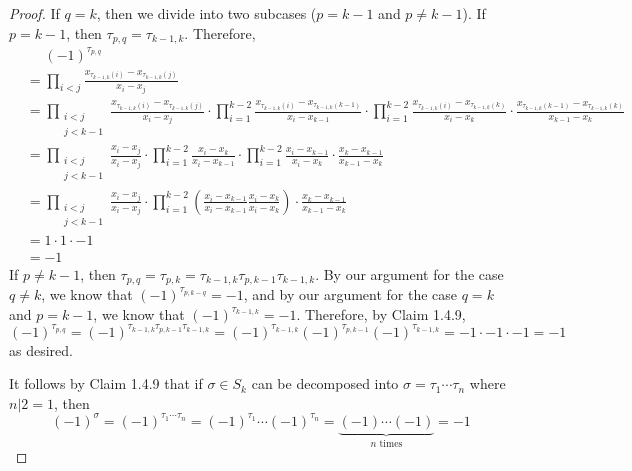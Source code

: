 \documentclass[../psets.tex]{subfiles}
\begin{document}
\begin{enumerate}[label={\textbf{1.4.\roman*.}}]
\begin{proof}
        If $q=k$, then we divide into two subcases ($p=k-1$ and $p\neq k-1$). If $p=k-1$, then $\tau_{p,q}=\tau_{k-1,k}$. Therefore,
        \begin{align*}
            &\phantom{=} (-1)^{\tau_{p,q}}\\
            &= \prod_{i<j}\frac{x_{\tau_{k-1,k}(i)}-x_{\tau_{k-1,k}(j)}}{x_i-x_j}\\
            &= \prod_{\substack{i<j\\j<k-1}}\frac{x_{\tau_{k-1,k}(i)}-x_{\tau_{k-1,k}(j)}}{x_i-x_j}\cdot\prod_{i=1}^{k-2}\frac{x_{\tau_{k-1,k}(i)}-x_{\tau_{k-1,k}(k-1)}}{x_i-x_{k-1}}\cdot\prod_{i=1}^{k-2}\frac{x_{\tau_{k-1,k}(i)}-x_{\tau_{k-1,k}(k)}}{x_i-x_k}\cdot\frac{x_{\tau_{k-1,k}(k-1)}-x_{\tau_{k-1,k}(k)}}{x_{k-1}-x_k}\\
            &= \prod_{\substack{i<j\\j<k-1}}\frac{x_i-x_j}{x_i-x_j}\cdot\prod_{i=1}^{k-2}\frac{x_i-x_k}{x_i-x_{k-1}}\cdot\prod_{i=1}^{k-2}\frac{x_i-x_{k-1}}{x_i-x_k}\cdot\frac{x_k-x_{k-1}}{x_{k-1}-x_k}\\
            &= \prod_{\substack{i<j\\j<k-1}}\frac{x_i-x_j}{x_i-x_j}\cdot\prod_{i=1}^{k-2}\left( \frac{x_i-x_{k-1}}{x_i-x_{k-1}}\frac{x_i-x_k}{x_i-x_k} \right)\cdot\frac{x_k-x_{k-1}}{x_{k-1}-x_k}\\
            &= 1\cdot 1\cdot -1\\
            &= -1
        \end{align*}
        If $p\neq k-1$, then $\tau_{p,q}=\tau_{p,k}=\tau_{k-1,k}\tau_{p,k-1}\tau_{k-1,k}$. By our argument for the case $q\neq k$, we know that $(-1)^{\tau_{p,k-q}}=-1$, and by our argument for the case $q=k$ and $p=k-1$, we know that $(-1)^{\tau_{k-1,k}}=-1$. Therefore, by Claim 1.4.9,
        \begin{equation*}
            (-1)^{\tau_{p,q}} = (-1)^{\tau_{k-1,k}\tau_{p,k-1}\tau_{k-1,k}}
            = (-1)^{\tau_{k-1,k}}(-1)^{\tau_{p,k-1}}(-1)^{\tau_{k-1,k}}
            = -1\cdot -1\cdot -1
            = -1
        \end{equation*}
        as desired.\par\medskip
        It follows by Claim 1.4.9 that if $\sigma\in S_k$ can be decomposed into $\sigma=\tau_1\cdots\tau_n$ where $n|2=1$, then
        \begin{equation*}
            (-1)^\sigma = (-1)^{\tau_1\cdots\tau_n}
            = (-1)^{\tau_1}\cdots(-1)^{\tau_n}
            = \underbrace{(-1)\cdots(-1)}_{n\text{ times}}
            = -1
        \end{equation*}

\end{proof}
\end{enumerate}
\end{document}
